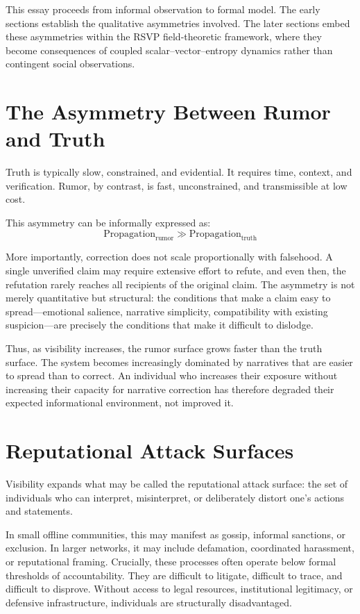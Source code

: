 \documentclass[12pt,a4paper]{article}
\begin{document}
This essay proceeds from informal observation to formal model. The early sections establish the qualitative asymmetries involved. The later sections embed these asymmetries within the RSVP field-theoretic framework, where they become consequences of coupled scalar--vector--entropy dynamics rather than contingent social observations.

\section{The Asymmetry Between Rumor and Truth}

Truth is typically slow, constrained, and evidential. It requires time, context, and verification. Rumor, by contrast, is fast, unconstrained, and transmissible at low cost.

This asymmetry can be informally expressed as:
\[
\text{Propagation}_{\text{rumor}} \gg \text{Propagation}_{\text{truth}}
\]

More importantly, correction does not scale proportionally with falsehood. A single unverified claim may require extensive effort to refute, and even then, the refutation rarely reaches all recipients of the original claim. The asymmetry is not merely quantitative but structural: the conditions that make a claim easy to spread---emotional salience, narrative simplicity, compatibility with existing suspicion---are precisely the conditions that make it difficult to dislodge.

Thus, as visibility increases, the rumor surface grows faster than the truth surface. The system becomes increasingly dominated by narratives that are easier to spread than to correct. An individual who increases their exposure without increasing their capacity for narrative correction has therefore degraded their expected informational environment, not improved it.


\section{Reputational Attack Surfaces}

Visibility expands what may be called the reputational attack surface: the set of individuals who can interpret, misinterpret, or deliberately distort one's actions and statements.

In small offline communities, this may manifest as gossip, informal sanctions, or exclusion. In larger networks, it may include defamation, coordinated harassment, or reputational framing. Crucially, these processes often operate below formal thresholds of accountability. They are difficult to litigate, difficult to trace, and difficult to disprove. Without access to legal resources, institutional legitimacy, or defensive infrastructure, individuals are structurally disadvantaged.
\end{document}
